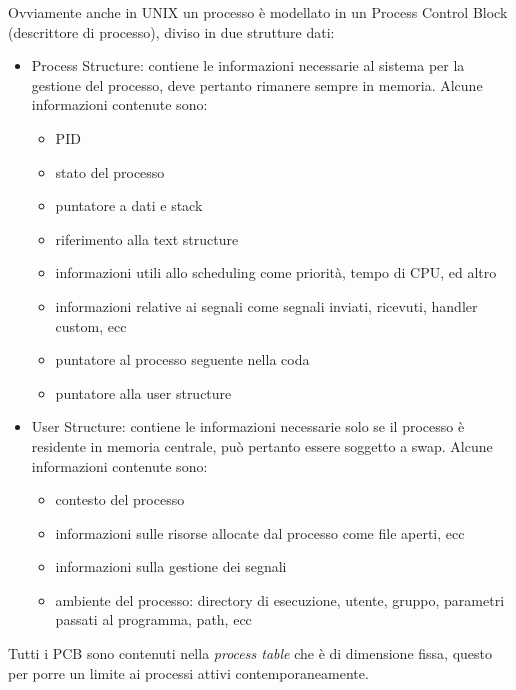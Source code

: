 Ovviamente anche in UNIX un processo è modellato in un Process Control Block (descrittore di processo), diviso in due strutture dati:
\begin{itemize}
    \item Process Structure: contiene le informazioni necessarie al sistema per la gestione del processo, deve pertanto rimanere sempre in memoria.
    Alcune informazioni contenute sono:
    \begin{itemize}
        \item PID
        \item stato del processo
        \item puntatore a dati e stack
        \item riferimento alla text structure
        \item informazioni utili allo scheduling come priorità, tempo di CPU, ed altro
        \item informazioni relative ai segnali come segnali inviati, ricevuti, handler custom, ecc
        \item puntatore al processo seguente nella coda
        \item puntatore alla user structure
    \end{itemize}
    \item User Structure: contiene le informazioni necessarie solo se il processo è residente in memoria centrale, può pertanto essere soggetto a swap.
    Alcune informazioni contenute sono:
    \begin{itemize}
        \item contesto del processo
        \item informazioni sulle risorse allocate dal processo come file aperti, ecc
        \item informazioni sulla gestione dei segnali
        \item ambiente del processo: directory di esecuzione, utente, gruppo, parametri passati al programma, path, ecc
    \end{itemize}
\end{itemize}
Tutti i PCB sono contenuti nella \emph{process table} che è di dimensione fissa, questo per porre un limite ai processi attivi contemporaneamente.


